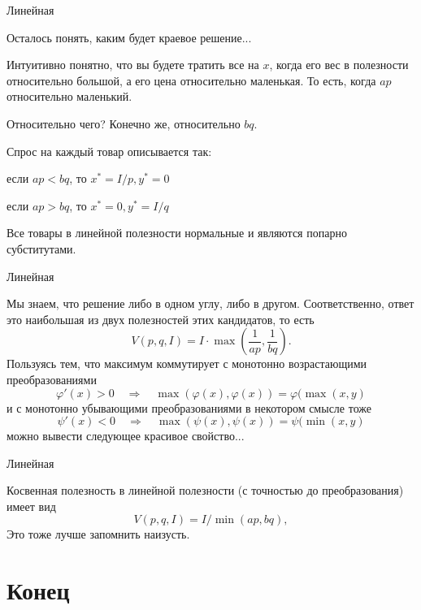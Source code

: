 \documentclass{beamer}
\begin{document}
\begin{frame}{Линейная}

Осталось понять, каким будет краевое решение...

Интуитивно понятно, что вы будете тратить все на $x$, когда его вес в полезности относительно большой, а его цена относительно маленькая. То есть, когда $ap$ относительно маленький. 

Относительно чего? Конечно же, относительно $bq$.

Спрос на каждый товар описывается так: 

если $ap < bq$, то $x^{\ast} = I/p, y^{\ast} = 0$

если $ap > bq$, то $x^{\ast} = 0, y^{\ast} = I/q$

Все товары в линейной полезности нормальные и являются попарно субститутами.

\end{frame}

\begin{frame}{Линейная}

Мы знаем, что решение либо в одном углу, либо в другом. Соответственно, ответ это наибольшая из двух полезностей этих кандидатов, то есть
$$V(p,q,I) = I \cdot \max(\frac{1}{ap}, \frac{1}{bq}).$$
Пользуясь тем, что максимум коммутирует с монотонно возрастающими преобразованиями
$$ \varphi'(x) >0 \quad \Rightarrow \quad \max(\varphi(x), \varphi(x)) = \varphi(\max(x, y)$$
и с монотонно убывающими преобразованиями в некотором смысле тоже
$$ \psi'(x) < 0 \quad \Rightarrow \quad \max(\psi(x), \psi(x)) = \psi(\min(x, y)$$
можно вывести следующее красивое свойство...

\end{frame}

\begin{frame}{Линейная}

Косвенная полезность в линейной полезности (с точностью до преобразования) имеет вид
$$V(p,q,I) = I / \min(ap, bq),$$
Это тоже лучше запомнить наизусть.
\end{frame}

\section{Конец}
\end{document}
